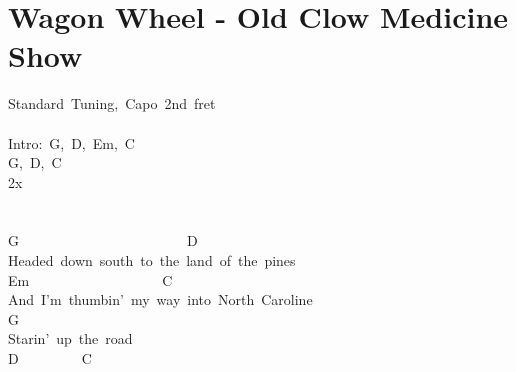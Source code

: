 \documentclass[]{book}
\let\stdsection\section
\renewcommand\section{\clearpage\stdsection}
\begin{document}
\hypertarget{wagon-wheel---old-clow-medicine-show}{%
\section{Wagon Wheel - Old Clow Medicine Show}\label{wagon-wheel---old-clow-medicine-show}}

Standard~Tuning,~Capo~2nd~fret\\
~\\
Intro:~G,~D,~Em,~C\\
\hspace*{0.333em}\hspace*{0.333em}\hspace*{0.333em}\hspace*{0.333em}\hspace*{0.333em}\hspace*{0.333em}\hspace*{0.333em}G,~D,~C~~~\\
\hspace*{0.333em}\hspace*{0.333em}\hspace*{0.333em}\hspace*{0.333em}\hspace*{0.333em}\hspace*{0.333em}\hspace*{0.333em}2x\\
~\\
~\\
G~~~~~~~~~~~~~~~~~~~~~~~~D\\
Headed~down~south~to~the~land~of~the~pines\\
\hspace*{0.333em}\hspace*{0.333em}\hspace*{0.333em}\hspace*{0.333em}\hspace*{0.333em}\hspace*{0.333em}\hspace*{0.333em}\hspace*{0.333em}Em~~~~~~~~~~~~~~~~~~~C\\
And~I'm~thumbin'~my~way~into~North~Caroline\\
G\\
Starin'~up~the~road\\
\hspace*{0.333em}\hspace*{0.333em}\hspace*{0.333em}\hspace*{0.333em}\hspace*{0.333em}\hspace*{0.333em}\hspace*{0.333em}\hspace*{0.333em}\hspace*{0.333em}\hspace*{0.333em}\hspace*{0.333em}\hspace*{0.333em}D~~~~~~~~~C\\
\end{document}
